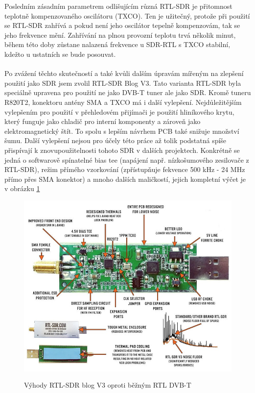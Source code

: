 \documentclass{ctuthesis}
\begin{document}
Posledním zásadním parametrem odlišujícím různá RTL-SDR je přitomnost teplotně kompenzovaného oscilátoru (TXCO). Ten je užitečný, protože při použití se RTL-SDR zahřívá a pokud není jeho oscilátor tepelně kompenzovám, tak se jeho frekvence mění. Zahřívání na plnou provozní teplotu trvá několik minut, během této doby zůstane nalazená frekvence u SDR-RTL s TXCO stabilní, kdežto u ustatních se bude posouvat.\\
\\ Po zvážení těchto skutečností a také kvůli dalším úpravám mířeným na zlepšení použití jako SDR jsem zvolil RTL-SDR Blog V3. Tato varianta RTL-SDR byla speciálně upravena pro použití ne jako DVB-T tuner ale jako SDR. Kromě tuneru R820T2, konektoru antény SMA a TXCO má i další vylepšení. Nejdůležitějším vylepšením pro použití v přehledovém přijímači je použití hliníkového krytu, který funguje jako chladič pro interní komponenty a zároveň jako elektromagnetický štít. To spolu s lepším návrhem PCB také snižuje množství šumu. Další vylepšení nejsou pro účely této práce až tolik podstatná spíše přispívají k znovupoužitelnosti tohoto SDR v dalších projektech. Konkrétně se jedná o softwarově spínatelné bias tee (napájení např. nízkošumového zesilovače z RTL-SDR), režim přímého vzorkování (zpřístupňuje fekvence 500 kHz - 24 MHz přímo přes SMA konektor) a mnoho dalších maličkostí, jejich kompletní výčet je v obrázku \ref{rtl_better}
\begin{figure}
\caption{Výhody RTL-SDR blog V3 oproti běžným RTL DVB-T \cite{rtlsdrcom}}
\includegraphics[width=1\textwidth]{./images/rtlsdr_v3_better.jpg}
\label{rtl_better}
\end{figure}
\end{document}
